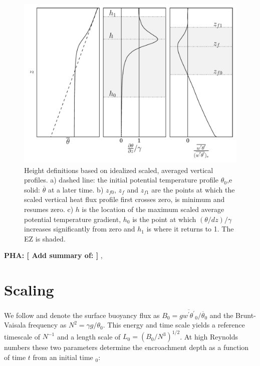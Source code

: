 \documentclass[referee]{svjour3}
\newcommand{\remarkpha}[1]{{ \bf PHA:  [ \footnotesize #1 ]}}
\begin{document}
\begin{figure}[htbp]
    \centering
    
    \includegraphics[scale=.5]{figures/height_defs.pdf}
    \caption[label a, b c Height Definitions]{Height definitions based on idealized scaled, averaged vertical profiles. a) dashed line: the initial potential temperature profile $\theta_0$,e solid: $\overline{\theta}$ at a later time. b)  $z_{f0}$, $z_{f}$ and $z_{f1}$ are the points at which the scaled vertical heat flux profile first crosses zero, is minimum and resumes zero. 
c)  $h$ is the location of the maximum scaled average potential temperature gradient, $h_{0}$ is the point at which $(\theta/dz)/\gamma$ increases significantly from zero and $h_{1}$ is where it returns to 1. The EZ is shaded.}
    \label{fig:hdefs} 
\end{figure}


\remarkpha{Add summary of: } \citet{Brooks12}, \citet{Fedorovich04}


\section{Scaling}


We follow \citep{Garcia14} and denote the surface buoyancy flux as $B_0 = g \overline{w^{'}\theta^{'}}_0/\overline{\theta}_0$ and the Brunt-Vaisala frequency as $N^2 = \gamma g/\theta_0$.
This energy and time scale yields a reference timescale of $N^{-1}$ and a length scale of $L_0=(B_0/N^3)^{1/2}$.  At high Reynolds numbers these two parameters determine the encroachment
depth as a function of time $t$ from an initial time $_0$:
\end{document}
